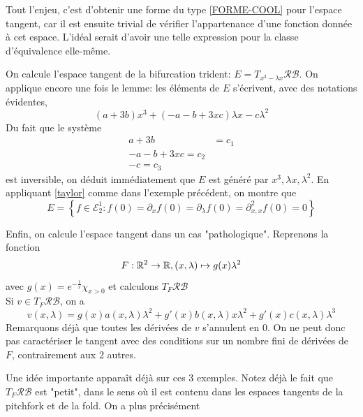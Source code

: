 \documentclass[memoire.tex]{subfiles}
\begin{document}
Tout l'enjeu, c'est d'obtenir une forme du type \ref{FORME-COOL} pour l'espace tangent, car il est ensuite trivial de vérifier l'appartenance d'une fonction donnée à cet espace. L'idéal serait d'avoir une telle expression pour la classe d'équivalence elle-même.
\begin{exemple}
    On calcule l'espace tangent de la bifurcation trident: $E=T_{x^3-\lambda x}\mathcal{RB}$. On applique encore une fois le lemme: les éléments de $E$ s'écrivent, avec des notations évidentes,
    \begin{equation*}
        (a+3b)x^3+(-a-b+3xc)\lambda x - c\lambda^2
    \end{equation*}
    Du fait que le système
    \begin{align*}
        a+3b&=c_1\\
        -a-b+3xc=c_2\\
        -c=c_3
    \end{align*}
    est inversible, on déduit immédiatement que $E$ est généré par $x^3,\lambda x, \lambda^2$. En appliquant \ref{taylor} comme dans l'exemple précédent, on montre que
    \begin{equation*}
        E=\left\{f\in\mathcal{E}_2^1: f(0)=\partial_x f(0)=\partial_\lambda f(0)=\partial^2_{x,x} f(0)=0\right\}
    \end{equation*}
\end{exemple}

\begin{exemple}
    Enfin, on calcule l'espace tangent dans un cas "pathologique". Reprenons la fonction 
        \begin{equation*}
        F: \mathbb{R}^2\rightarrow \mathbb{R}, (x,\lambda)\mapsto g(x)\lambda^2
    \end{equation*}
    avec $g(x)=e^{-\frac{1}{x}}\chi_{x>0}$ et calculons $T_F\mathcal{RB}$\\
    Si $v\in T_F\mathcal{RB}$, on a
    \begin{equation*}
        v(x,\lambda)=g(x)a(x,\lambda)\lambda^2
        +g'(x)b(x,\lambda)x\lambda^2+g'(x)c(x,\lambda)\lambda^3
    \end{equation*}
    Remarquons déjà que toutes les dérivées de $v$ s'annulent en $0$. On ne peut donc pas 
    caractériser le tangent avec des conditions sur un nombre fini de dérivées de $F$, contrairement aux 2 autres.
\end{exemple}




Une idée importante apparaît déjà sur ces 
3 exemples. Notez déjà le fait que 
$T_F\mathcal{RB}$ est "petit", dans le sens où il est contenu dans les espaces tangents de la pitchfork et de la fold. On a plus précisément
\end{document}
